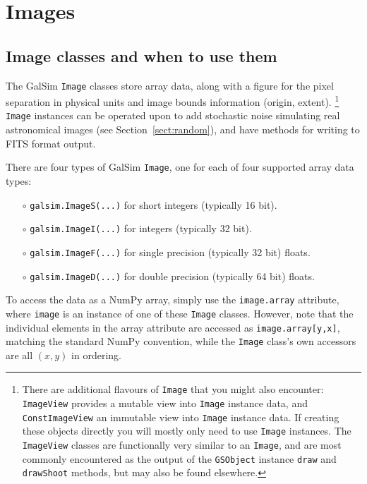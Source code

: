 \documentclass[preprint,11pt]{aastex}
\begin{document}
\section{Images}\label{sect:image}

\subsection{Image classes and when to use them}\label{sect:imageclasses}
The GalSim \texttt{Image} classes store array data, along with a
figure for the pixel separation in physical units and image bounds
information (origin, extent).  \footnote{There are additional flavours
  of \texttt{Image} that you might also encounter: \texttt{ImageView}
  provides a mutable view into \texttt{Image} instance data, and
  \texttt{ConstImageView} an immutable view into \texttt{Image}
  instance data. If creating these objects directly you will mostly
  only need to use \texttt{Image} instances.  The \texttt{ImageView}
  classes are functionally very similar to an \texttt{Image}, and are
  most commonly encountered as the output of the \texttt{GSObject}
  instance \texttt{draw} and \texttt{drawShoot} methods, but may also
  be found elsewhere.}
\texttt{Image} instances can be operated upon to add stochastic noise
simulating real astronomical images (see Section~\ref{sect:random}),
and have methods for writing to FITS format output.

There are four types of GalSim \texttt{Image}, one for each of four
supported array data types:
\begin{itemize}
\item[$\circ$] \texttt{galsim.ImageS(...)} {for short integers (typically 16 bit).}

\item[$\circ$] \texttt{galsim.ImageI(...)} {for integers (typically 32 bit).}

\item[$\circ$] \texttt{galsim.ImageF(...)} {for single precision (typically 32 bit)
  floats.}

\item[$\circ$] \texttt{galsim.ImageD(...)} {for double precision (typically 64 bit)
  floats.}

\end{itemize}
To access the data as a NumPy array, simply use the \texttt{image.array}
attribute, where \texttt{image} is an instance of one of these
\texttt{Image} classes.  However, note that the individual elements in
the array attribute are accessed as \texttt{image.array[y,x]}, matching
the standard NumPy convention, while the \texttt{Image} class's own
accessors are all $(x,y)$ in ordering.
\end{document}
